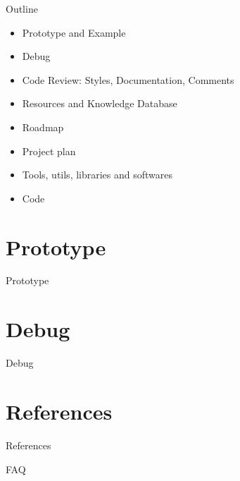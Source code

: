 \documentclass{beamer}
\begin{document}
\begin{frame}{Outline}
  \begin{itemize}
    \item Prototype and Example
    \item Debug
    \item Code Review: Styles, Documentation, Comments
    \item Resources and Knowledge Database
    \item Roadmap
    \item Project plan
    \item Tools, utils, libraries and softwares
    \item Code \cite{coding-prompts}
  \end{itemize}
\end{frame}

\section{Prototype}
\begin{frame}{Prototype}
\end{frame}

\section{Debug}
\begin{frame}{Debug}
\end{frame}


\section{References}
\begin{frame}[t,allowframebreaks]{References}
  \nocite{*}
  \RaggedRight
  \printbibliography
\end{frame}


\begin{frame}{FAQ}

\end{frame}
\end{document}
